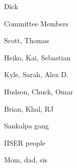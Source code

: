 \begin{acknowledgments}

  Dick

  Committee Members

  Scott, Thomas

  Heiko, Kai, Sebastian

  Kyle, Sarah, Alex D.

  Hudson, Chuck, Omar

  Brian, Khal, RJ

  Sankalpa gang

  IISER people

  Mom, dad, sis

\end{acknowledgments}

